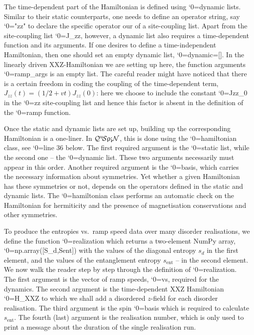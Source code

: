 \documentclass{SciPost}
\newcommand\0{\scalebox{-1}[1]{0}}
\let\svttfamily\ttfamily
\renewcommand\ttfamily{\svttfamily\catcode`0=\active }
\renewcommand\texttt{\bgroup\ttfamily\texttthelp}
\def\texttthelp#1{#1\egroup}
\newcommand{\qspin}{$\mathcal{Q}^{\mathrm{u}}\!\mathcal{S}\uprho\mathrm{\text{\textexclamdown}}\mathcal{N}$}
\begin{document}
 
%
The time-dependent part of the Hamiltonian is defined using \texttt{dynamic} lists. Similar to their static counterparts, one needs to define an operator string, say \texttt{"zz"} to declare the specific operator our of a site-coupling list. Apart from the site-coupling list \texttt{J\_zz}, however, a dynamic list also requires a time-dependent function and its arguments. If one desires to define a time-independent Hamiltonian, then one should set an empty dynamic list, \texttt{dynamic=[]}. In the linearly driven XXZ-Hamiltonian we are setting up here, the function arguments \texttt{ramp\_args} is an empty list. The careful reader might have noticed that there is a certain freedom in coding the coupling of the time-dependent term, $J_{zz}(t)=(1/2+vt)J_{zz}(0)$: here we choose to include the constant \texttt{Jzz\_0} in the \texttt{zz} site-coupling list and hence this factor is absent in the definition of the \texttt{ramp} function.

% 
Once the static and dynamic lists are set up, building up the corresponding Hamiltonian is a one-liner. In \qspin, this is done using the \texttt{hamiltonian} class, see \texttt{line 36} below. The first required argument is the \texttt{static} list, while the second one -- the \texttt{dynamic} list. These two arguments necessarily must appear in this order. Another required argument is the \texttt{basis}, which carries the necessary information about symmetries. Yet whether a given Hamiltonian has these symmetries or not, depends on the operators defined in the static and dynamic lists. The \texttt{hamiltonian} class performs an automatic check on the Hamiltonian for hermiticity and the presence of magnetisation conservations and other symmetries. %

% 
To produce the entropies vs.~ramp speed data over many disorder realisations, we define the function \texttt{realization} which returns a two-element NumPy array, \texttt{np.array([S\_d,Sent])} with the values of the diagonal entropy $s_d$ in the first element, and the values of the entanglement entropy $s_\mathrm{ent}$ -- in the second element. We now walk the reader step by step through the definition of \texttt{realization}. The first argument is the vector of ramp speeds, \texttt{vs}, required for the dynamics. The second argument is the time-dependent XXZ Hamiltonian \texttt{H\_XXZ} to which we shall add a disordered $z$-field for each disorder realisation. The third argument is the spin \texttt{basis} which is required to calculate $s_\mathrm{ent}$. The fourth (last) argument is the realisation number, which is only used to print a message about the duration of the single realisation run. 
\end{document}
